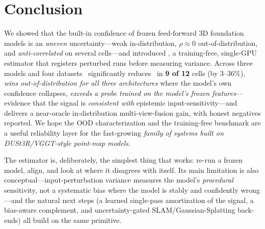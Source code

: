\section{Conclusion}
\label{sec:conclusion}

We showed that the built-in confidence of frozen feed-forward 3D foundation models is an
\emph{uneven} uncertainty---weak in-distribution, $\rho{\approx}0$ out-of-distribution, and
\emph{anti-correlated} on several cells---and introduced \trustr, a training-free, single-GPU
estimator that registers perturbed runs before measuring variance. Across three models and four
datasets \trustr\ significantly reduces \ause\ in \textbf{9 of 12} cells (by $3\text{--}36\%$),
\emph{wins out-of-distribution for all three architectures} where the model's own confidence
collapses, \emph{exceeds a probe trained on the model's frozen features}---evidence that the signal
is \emph{consistent with} epistemic input-sensitivity---and delivers a near-oracle in-distribution multi-view-fusion gain,
with honest negatives reported. We hope the OOD characterization and the training-free benchmark are a useful
reliability layer for the fast-growing \emph{family of systems built on DUSt3R/VGGT-style point-map models}.

The estimator is, deliberately, the simplest thing that works: re-run a frozen model, align, and
look at where it disagrees with itself. Its main limitation is also conceptual---input-perturbation
variance measures the model's \emph{procedural} sensitivity, not a systematic bias where the model is
stably and confidently wrong---and the natural next steps (a learned single-pass amortization of the
signal, a bias-aware complement, and uncertainty-gated SLAM/Gaussian-Splatting back-ends) all build on
the same primitive.
